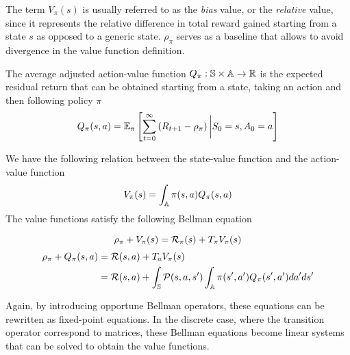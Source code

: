 The term $V_\pi(s)$ is usually referred to as the \emph{bias} value, or the
\emph{relative} value, since it represents the relative difference in total
reward gained starting from a state $s$ as opposed to a generic state. 
$\rho_\pi$ serves as a baseline that allows to avoid divergence in the value
function definition.
\begin{definition}
	The average adjusted action-value function $Q_\pi : \S \times \A \to \R$ is 
	the expected residual return that can be obtained starting from a state,
	taking an action and then following policy $\pi$
	\begin{equation}
		Q_\pi(s, a) = \E[\pi]{\sum^{\infty}_{t=0} \left(R_{t+1} -
			\rho_\pi\right) \bigg| S_0 = s, A_0
		= a}
	\end{equation}
\end{definition}
We have the following relation between the state-value function and the
action-value function
\begin{equation}\label{eq:VQ_equality}
	V_\pi(s) = \int_\A \pi(s,a) Q_\pi(s,a)
\end{equation}
The value functions satisfy the following Bellman equation 
\begin{proposition}
	\begin{equation}
		\rho_\pi + V_\pi(s) = \calR_\pi(s) + T_\pi V_\pi(s)
	\end{equation}
	\begin{equation}
		\begin{split}
			\rho_\pi + Q_\pi(s,a) &= \calR(s,a) + T_a V_\pi(s)\\
			&= \calR(s,a) + \int_{\S} \calP(s,a,s') \int_\A \pi(s',a') Q_\pi(s',a') da' ds'
		\end{split}
	\end{equation}
\end{proposition}
Again, by introducing opportune Bellman operators, these equations can be rewritten as fixed-point equations. In the discrete case, where the transition operator correspond to matrices, these Bellman equations become linear systems that can be solved to obtain the value functions. 

